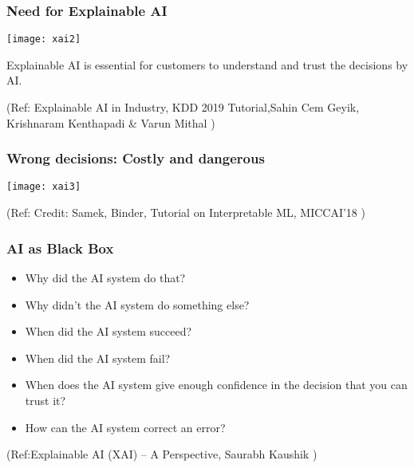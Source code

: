 \begin{frame}[fragile]\frametitle{Need for Explainable AI}
\begin{center}
\texttt{[image: xai2]}
\end{center}

Explainable AI is essential for customers to understand and trust the decisions by AI.

\tiny{(Ref: Explainable AI in Industry, KDD 2019 Tutorial,Sahin Cem Geyik, Krishnaram Kenthapadi \& Varun Mithal  )}

\end{frame}

\begin{frame}[fragile]\frametitle{Wrong decisions: Costly and dangerous}
\begin{center}
\texttt{[image: xai3]}
\end{center}

\tiny{(Ref: Credit: Samek, Binder, Tutorial on Interpretable ML, MICCAI'18 )}

\end{frame}

\begin{frame}[fragile]\frametitle{AI as Black Box }
\begin{itemize}
\item Why did the AI system do that?
\item Why didn't the AI system do something else?
\item When did the AI system succeed?
\item When did the AI system fail?
\item When does the AI system give enough confidence in the decision that you can trust it?
\item How can the AI system correct an error?
\end{itemize}

\tiny{(Ref:Explainable AI (XAI) – A Perspective, Saurabh Kaushik  )}

\end{frame}

